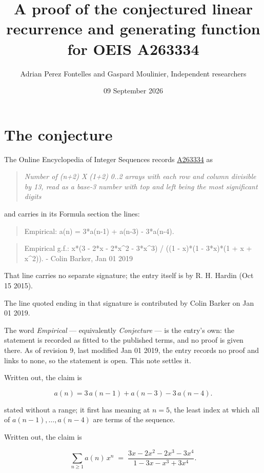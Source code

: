 \documentclass[11pt]{article}
\title{A proof of the conjectured linear recurrence and generating function for OEIS A263334}
\author{Adrian Perez Fontelles and Gaspard Moulinier, Independent researchers}
\date{09 September 2026}
\theoremstyle{definition}
\begin{document}
\maketitle
\section{The conjecture}

The Online Encyclopedia of Integer Sequences records \href{https://oeis.org/A263334}{A263334} as

\begin{quote}\itshape Number of (n+2) X (1+2) 0..2 arrays with each row and column divisible by 13, read as a base-3 number with top and left being the most significant digits\end{quote}

and carries in its Formula section the lines:

\begin{quote}\ttfamily Empirical: a(n) = 3*a(n-1) + a(n-3) - 3*a(n-4).\end{quote}

\begin{quote}\ttfamily Empirical g.f.: x*(3 - 2*x - 2*x\textasciicircum{}2 - 3*x\textasciicircum{}3) / ((1 - x)*(1 - 3*x)*(1 + x + x\textasciicircum{}2)). - Colin Barker, Jan 01 2019\end{quote}

That line carries no separate signature; the entry itself is by R. H. Hardin (Oct 15 2015).

The line quoted ending in that signature is contributed by Colin Barker on Jan 01 2019.

The word {\itshape Empirical} --- equivalently {\itshape Conjecture} --- is the entry's own: the statement is recorded as fitted to the published terms, and no proof is given there. As of revision 9, last modified Jan 01 2019, the entry records no proof and links to none, so the statement is open. This note settles it.

Written out, the claim is

\[a(n) = 3\,a(n-1) + a(n-3) - 3\,a(n-4).\]

stated without a range; it first has meaning at $n = 5$, the least index at which all of $a(n-1),\dots,a(n-4)$ are terms of the sequence.

Written out, the claim is

\[\sum_{n \ge 1} a(n)\,x^n \;=\; \frac{3x - 2x^{2} - 2x^{3} - 3x^{4}}{1 - 3x - x^{3} + 3x^{4}}.\]
\end{document}

